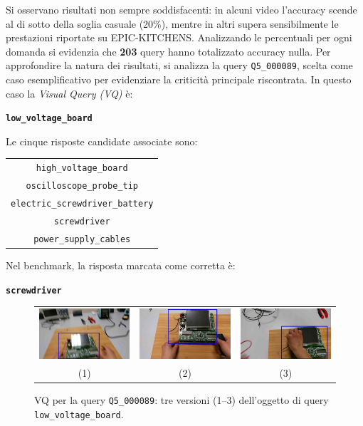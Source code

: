 Si osservano risultati non sempre soddisfacenti: in alcuni video l'accuracy scende al di sotto della soglia casuale (20\%), 
mentre in altri supera sensibilmente le prestazioni riportate su EPIC-KITCHENS. 
Analizzando le percentuali per ogni domanda si evidenzia che \textbf{203} query hanno totalizzato accuracy nulla. 
Per approfondire la natura dei risultati, si analizza la query \texttt{Q5\_000089}, scelta come caso esemplificativo per evidenziare la criticità principale riscontrata.
In questo caso la \emph{Visual Query (VQ)} è:  

\begin{center}
\textbf{\texttt{low\_voltage\_board}}
\end{center}

Le cinque risposte candidate associate sono:  

\begin{center}
\begin{tabular}{|c|}
\hline
\texttt{high\_voltage\_board} \\
\texttt{oscilloscope\_probe\_tip} \\
\texttt{electric\_screwdriver\_battery} \\
\texttt{screwdriver} \\
\texttt{power\_supply\_cables} \\
\hline
\end{tabular}
\end{center}

Nel benchmark, la risposta marcata come corretta è:  
\begin{center}
\textbf{\texttt{screwdriver}}
\end{center}

\begin{figure}[ht]
    \centering
    \setlength{\tabcolsep}{4pt}
    \begin{tabular}{ccc}
        \includegraphics[width=0.31\linewidth]{Images/zeroaccvq1.jpg} &
        \includegraphics[width=0.31\linewidth]{Images/zeroaccvq2.jpg} &
        \includegraphics[width=0.31\linewidth]{Images/zeroaccvq3.jpg} \\
        (1) & (2) & (3)
    \end{tabular}
    \caption{VQ per la query \texttt{Q5\_000089}: tre versioni (1–3) dell'oggetto di query \texttt{low\_voltage\_board}.}
    \label{fig:vq_zero_acc}
\end{figure}

